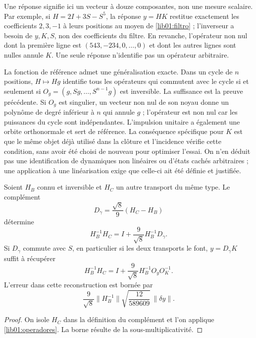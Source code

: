 Une réponse signifie ici un vecteur à douze composantes, non une
mesure scalaire. Par exemple, si \(H=2I+3S-S^5\), la réponse
\(y=HK\) restitue exactement les coefficients \(2,3,-1\) à leurs
positions au moyen de \eqref{lib01:filtro} ; l’inverseur a besoin de \(y,K,S\),
non des coefficients du filtre. En revanche, l’opérateur non nul dont la première
ligne est \((543,-234,0,\ldots,0)\) et dont les autres lignes sont nulles
annule \(K\). Une seule réponse n’identifie pas un opérateur arbitraire.

La fonction de référence admet une généralisation exacte. Dans un cycle de
\(n\) positions, \(H\mapsto Hg\) identifie tous les opérateurs
qui commutent avec le cycle si et seulement si
\(O_g=(g,Sg,\ldots,S^{n-1}g)\) est inversible. La suffisance est la
preuve précédente. Si \(O_g\) est singulier, un vecteur non nul de son noyau
donne un polynôme de degré inférieur à \(n\) qui annule \(g\) ; l’opérateur
est non nul car les puissances du cycle sont indépendantes. L’impulsion
unitaire a également une orbite orthonormale et sert de référence. La
conséquence spécifique pour \(K\) est que le même objet déjà utilisé dans
la clôture et l’incidence vérifie cette condition, sans avoir été choisi de
nouveau pour optimiser l’essai. On n’en déduit pas une identification de
dynamiques non linéaires ou d’états cachés arbitraires ; une application à
une linéarisation exige que celle-ci ait été définie et justifiée.

\begin{corollary}
\label{lib01:holonomia}
Soient \(H_B\) connu et inversible et \(H_C\) un autre transport du même type. Le complément
\[
 D_\gamma=\frac{\sqrt8}{9}(H_C-H_B)
\]
détermine
\[
 H_B^{-1}H_C=I+\frac9{\sqrt8}H_B^{-1}D_\gamma.
\]
Si \(D_\gamma\) commute avec \(S\), en particulier si les deux
transports le font, \(y=D_\gamma K\) suffit à récupérer
\begin{equation}
 H_B^{-1}H_C
 =I+\frac9{\sqrt8}H_B^{-1}O_yO_K^{-1}.
 \label{lib01:holonomia-una-respuesta}
\end{equation}
L'erreur dans cette reconstruction est bornée par
\[
 \frac9{\sqrt8}\|H_B^{-1}\|
 \sqrt{\frac{12}{589609}}\,\|\delta y\|.
\]
\end{corollary}
\begin{proof}
On isole \(H_C\) dans la définition du complément et l'on applique \cref{lib01:operadores}. La borne résulte de la sous-multiplicativité.
\end{proof}

